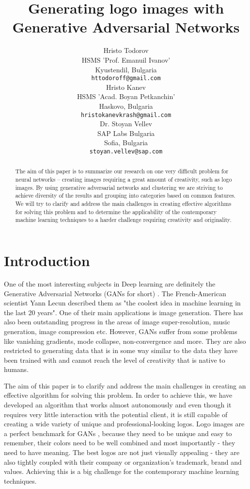 \documentclass{article}
\title{Generating logo images with Generative Adversarial Networks}
\author{
 Hristo Todorov \\
  HSMS 'Prof. Emanuil Ivanov' \\
  Kyustendil, Bulgaria \\
  \texttt{httodoroff@gmail.com} \\
   \And
 Hristo Kanev \\
  HSMS 'Acad. Boyan Petkanchin' \\
  Haskovo, Bulgaria \\
  \texttt{hristokanevkrash@gmail.com} \\
  \And
  Dr. Stoyan Vellev \\
  SAP Labs Bulgaria \\
  Sofia, Bulgaria \\
  \texttt{stoyan.vellev@sap.com} \\
}
\begin{document}
\maketitle
\begin{abstract}
The aim of this paper is to summarize our research on one very difficult problem for neural networks – creating images requiring a great amount of creativity, such as logo images. By using generative adversarial networks and clustering we are striving to achieve diversity of the results and grouping into categories based on common features. We will try to clarify and address the main challenges in creating effective algorithms for solving this problem and to determine the applicability of the contemporary machine learning techniques to a harder challenge requiring creativity and originality.
\end{abstract}

\section{Introduction}
One of the most interesting subjects in Deep learning are definitely the Generative Adversarial Networks (GANs for short) \cite{goodfellow2014generative}. The French-American scientist Yann Lecun described them as "the coolest idea in machine learning in the last 20 years". One of their main applications is image generation. There has also been outstanding progress in the areas of image super-resolution, music generation, image compression etc. However, GANs suffer from some problems like vanishing gradients, mode collapse, non-convergence and more. They are also restricted to generating data that is in some way similar to the data they have been trained with and cannot reach the level of creativity that is native to humans.

The aim of this paper is to clarify and address the main challenges in creating an effective algorithm for solving this problem. In order to achieve this, we have developed an algorithm that works almost autonomously and even though it requires very little interaction with the potential client, it is still capable of creating a wide variety of unique and professional-looking logos. Logo images are a perfect benchmark for GANs \cite{alex2017logo}, because they need to be unique and easy to remember, their colors need to be well combined and most importantly - they need to have meaning. The best logos are not just visually appealing - they are also tightly coupled with their company or organization's trademark, brand and values. Achieving this is a big challenge for the contemporary machine learning techniques.
\end{document}
